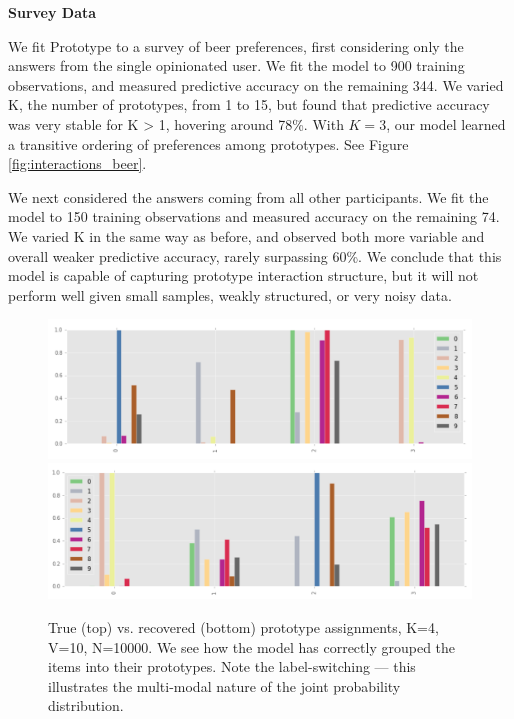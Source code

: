 \bigskip

\textbf{Survey Data}

\bigskip

We fit Prototype to a survey of beer preferences, first considering only the answers from the single opinionated user.
We fit the model to 900 training observations, and measured predictive accuracy on the remaining 344.
We varied K, the number of prototypes, from 1 to 15, but found that predictive accuracy was very stable for K > 1, hovering around 78\%.
With $K=3$, our model learned a transitive ordering of preferences among prototypes. See Figure \ref{fig:interactions_beer}.

We next considered the answers coming from all other participants.
We fit the model to 150 training observations and measured accuracy on the remaining 74.
We varied K in the same way as before, and observed both more variable and overall weaker predictive accuracy, rarely surpassing 60\%.
We conclude that this model is capable of capturing prototype interaction structure, but it will not perform well given small samples, weakly structured, or very noisy data.


\begin{figure}
\includegraphics[width=\textwidth]{images/pi}
\includegraphics[width=\textwidth]{images/gamma}
\caption{True (top) vs. recovered (bottom) prototype assignments, K=4, V=10, N=10000. We see how the model has correctly grouped the items into their prototypes. Note the label-switching --- this illustrates the multi-modal nature of the joint probability distribution.}
\label{fig:pi_v_gamma} 
\end{figure}



